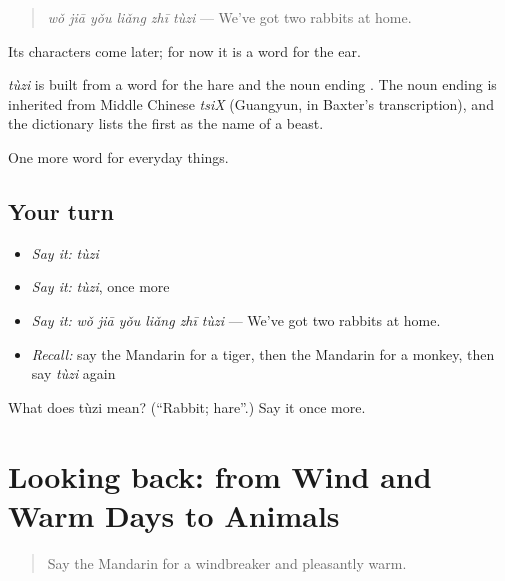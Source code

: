 \begin{quote}
\emph{wǒ jiā yǒu liǎng zhī tùzi} — We've got two rabbits at home.
\end{quote}

Its characters come later; for now it is a word for the ear.

\begin{cousinweb}
\emph{tùzi} is built from a word for the hare and the noun ending . The noun ending is inherited from Middle Chinese \emph{tsiX} (Guangyun, in Baxter's transcription), and the dictionary lists the first as the name of a beast.
\end{cousinweb}

\begin{grammarlens}[title={What you've built}]
One more word for everyday things.
\end{grammarlens}

\subsection*{Your turn}
\begin{itemize}
\raggedright
  \item \emph{Say it:} \emph{tùzi}
  \item \emph{Say it:} \emph{tùzi}, once more
  \item \emph{Say it:} \emph{wǒ jiā yǒu liǎng zhī tùzi} — We've got two rabbits at home.
  \item \emph{Recall:} say the Mandarin for a tiger, then the Mandarin for a monkey, then say \emph{tùzi} again
\end{itemize}

\begin{tcolorbox}[breakable,colback=teal!4,colframe=teal!35!black,title={Before you move on}]
What does tùzi mean? (\textquotedblleft{}Rabbit; hare\textquotedblright{}.) Say it once more.
\end{tcolorbox}
\section[(dialogue)]{Looking back: from Wind and Warm Days to Animals}

\label{lesson:ZH-R223-review-218-223}



\begin{quote}
Say the Mandarin for a windbreaker and pleasantly warm.
\end{quote}

